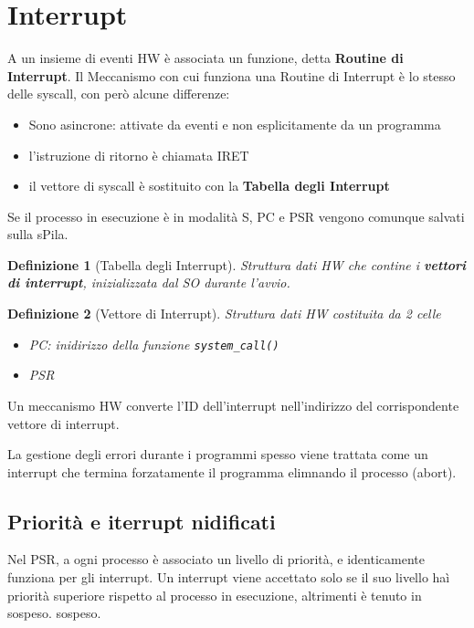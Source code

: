 \documentclass[12pt, a4paper]{report}
\newtheorem{definition}{Definizione}
\begin{document}
\section{Interrupt}
A un insieme di eventi HW è associata un funzione, detta \textbf{Routine di
	Interrupt}. Il Meccanismo con cui funziona una Routine di Interrupt è lo
stesso delle syscall, con però alcune differenze:
\begin{itemize}
	\item Sono asincrone: attivate da eventi e non esplicitamente da un
	      programma
	\item l'istruzione di ritorno è chiamata IRET
	\item il vettore di syscall è sostituito con la \textbf{Tabella degli
		      Interrupt}
\end{itemize}
Se il processo in esecuzione è in modalità S, PC e PSR vengono comunque
salvati sulla sPila.
\begin{definition}[Tabella degli Interrupt]
	Struttura dati HW che contine i \textbf{vettori di interrupt}, inizializzata
	dal SO durante l'avvio.
\end{definition}
\begin{definition}[Vettore di Interrupt]
	Struttura dati HW costituita da 2 celle
	\begin{itemize}
		\item PC: inidirizzo della funzione \texttt{system\_call()}
		\item PSR
	\end{itemize}
\end{definition}
Un meccanismo HW converte l'ID dell'interrupt nell'indirizzo del corrispondente
vettore di interrupt.

La gestione degli errori durante i programmi spesso viene trattata come un
interrupt che termina forzatamente il programma elimnando il processo (abort).

\subsection{Priorità e iterrupt nidificati}
Nel PSR, a ogni processo è associato un livello di priorità, e identicamente
funziona per gli interrupt. Un interrupt viene accettato solo se il suo livello
haì priorità superiore rispetto al processo in esecuzione, altrimenti è tenuto
in sospeso. sospeso.
\end{document}
